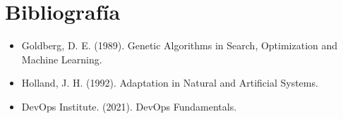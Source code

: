 \section*{Bibliografía}
\begin{itemize}
  \item Goldberg, D. E. (1989). Genetic Algorithms in Search, Optimization and Machine Learning.
  \item Holland, J. H. (1992). Adaptation in Natural and Artificial Systems.
  \item DevOps Institute. (2021). DevOps Fundamentals.
\end{itemize}
